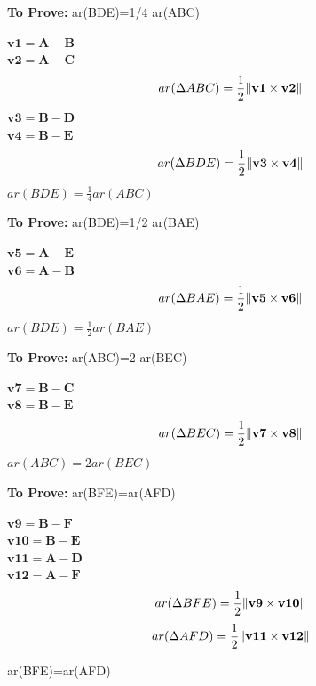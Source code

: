 \documentclass[10pt, a4paper]{article}
\let\vec\mathbf
\begin{document}
\textbf{To Prove:} ar(BDE)=1/4 ar(ABC)
  \begin{center}
 
 $\vec{v1}=\vec{A-B}$\\
 $\vec{v2}=\vec{A-C}$\\
	  \begin{equation}
ar(\Delta ABC) =\frac{1}{2}\norm{\vec{v1}\times\vec{v2}}
	  \end{equation}
$\vec{v3}=\vec{B-D}$\\
 $\vec{v4}=\vec{B-E}$\\
	  \begin{equation}
 ar(\Delta BDE) =\frac{1}{2}\norm{\vec{v3}\times\vec{v4}}
          \end{equation}
  $ar(BDE)= \frac{1}{4} ar(ABC)$

 \end{center}
 \textbf{To Prove:}  ar(BDE)=1/2 ar(BAE) 
 \begin{center}
$\vec{v5}=\vec{A-E}$\\
$\vec{v6}=\vec{A-B}$\\
	 \begin{equation}
 ar(\Delta BAE) =\frac{1}{2}\norm{\vec{v5}\times\vec{v6}}
	 \end{equation}
 $ar(BDE)=\frac{1}{2} ar(BAE)$
\end{center}
 \textbf{To Prove:}  ar(ABC)=2 ar(BEC) 
 \begin{center}
 $\vec{v7}=\vec{B-C}$\\
$\vec{v8}=\vec{B-E}$\\
	 \begin{equation}
 ar(\Delta BEC) =\frac{1}{2}\norm{\vec{v7}\times\vec{v8}}
	 \end{equation}
 $ar(ABC)=2 ar(BEC)$
 \end{center}
 \textbf{To Prove:}  ar(BFE)=ar(AFD) 
 \begin{center}
 $\vec{v9}=\vec{B-F}$\\
$\vec{v10}=\vec{B-E}$\\
$\vec{v11}=\vec{A-D}$\\
$\vec{v12}=\vec{A-F}$\\
	 \begin{equation}
 ar(\Delta BFE) =\frac{1}{2}\norm{\vec{v9}\times\vec{v10}}
	 \end{equation}
	 \begin{equation}
 ar(\Delta AFD) =\frac{1}{2}\norm{\vec{v11}\times\vec{v12}}
	 \end{equation}

 ar(BFE)=ar(AFD)
 \end{center}
\end{document}
